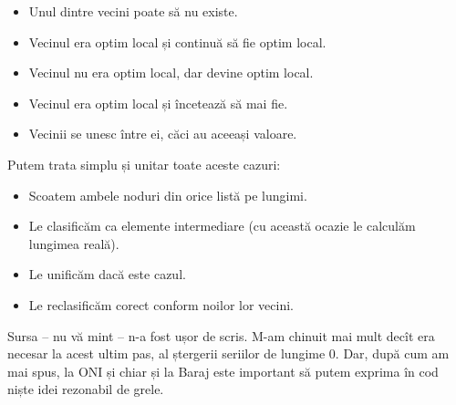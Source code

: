 \documentclass[../main.tex]{subfiles}
\begin{document}
\begin{itemize}
  \item Unul dintre vecini poate să nu existe.
  \item Vecinul era optim local și continuă să fie optim local.
  \item Vecinul nu era optim local, dar devine optim local.
  \item Vecinul era optim local și încetează să mai fie.
  \item Vecinii se unesc între ei, căci au aceeași valoare.
\end{itemize}
Putem trata simplu și unitar toate aceste cazuri:

\begin{itemize}
  \item Scoatem ambele noduri din orice listă pe lungimi.
  \item Le clasificăm ca elemente intermediare (cu această ocazie le calculăm lungimea reală).
  \item Le unificăm dacă este cazul.
  \item Le reclasificăm corect conform noilor lor vecini.
\end{itemize}

Sursa -- nu vă mint -- n-a fost ușor de scris. M-am chinuit mai mult decît era necesar la acest ultim pas, al ștergerii seriilor de lungime 0. Dar, după cum am mai spus, la ONI și chiar și la Baraj este important să putem exprima în cod niște idei rezonabil de grele.
\end{document}
